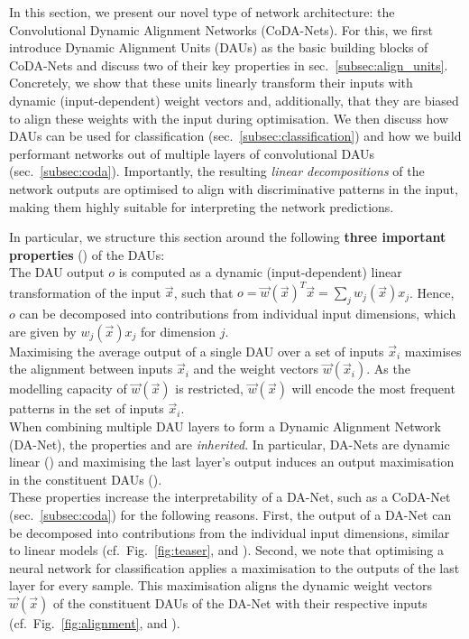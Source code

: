 
In this section, we present our novel type of network architecture: the Convolutional Dynamic Alignment Networks (CoDA-Nets). For this, we first introduce Dynamic Alignment Units (DAUs) as the basic building blocks of CoDA-Nets and discuss two of their key properties in sec.~\ref{subsec:align_units}. Concretely, we show that these units linearly transform their inputs with dynamic (input-dependent) weight vectors and, additionally, that they are biased to align these weights with the input during optimisation. 
We then discuss how DAUs can be used for classification (sec.~\ref{subsec:classification}) and how we build performant networks out of multiple layers of convolutional DAUs (sec.~\ref{subsec:coda}). Importantly, the resulting \emph{linear decompositions} of the network outputs are optimised to align with discriminative patterns in the input, making them highly suitable for interpreting the network predictions. 

In particular, we structure this section around the following \textbf{three important properties} () of the DAUs:
\\[.25em]
 The DAU output $o$ is computed as a dynamic (input-dependent) linear transformation of the input $\vec x$, such that \mbox{$o=\vec w(\vec x)^T\vec x=\sum_jw_j(\vec x)x_j$}. 
Hence, 
$o$ can be decomposed into contributions  
from individual input dimensions, which are given by $w_j(\vec x)x_j$ for dimension $j$.
\\[.5em]
 Maximising the average output of a single DAU over a set of inputs $\vec x_i$ 
maximises the alignment between inputs $\vec x_i$ and the weight vectors $\vec w(\vec x_i)$. As the modelling capacity of $\vec w(\vec x)$ is restricted, $\vec w(\vec x)$ will encode the most frequent patterns in the set of inputs $\vec x_i$.
\\[.5em]
 When combining multiple DAU layers to form a \mbox{Dynamic} Alignment Network (DA-Net), the properties  and  are \emph{inherited}. In particular, DA-Nets are dynamic linear () and maximising the last layer's output induces an output maximisation in the constituent DAUs ().
\\[.5em]
These properties increase the interpretability
of a DA-Net, such as a CoDA-Net (sec.~\ref{subsec:coda}) for the following reasons.
First, the output of a DA-Net can be decomposed into contributions from the individual input dimensions, similar to linear models (cf.~Fig.~\ref{fig:teaser},  and ).
Second, we note that optimising a neural network for classification applies a maximisation to the outputs of the last layer for every sample. 
This maximisation aligns the dynamic weight vectors $\vec w(\vec x)$ of the constituent DAUs of the DA-Net with their respective inputs (cf.~Fig.~\ref{fig:alignment},  and ).

